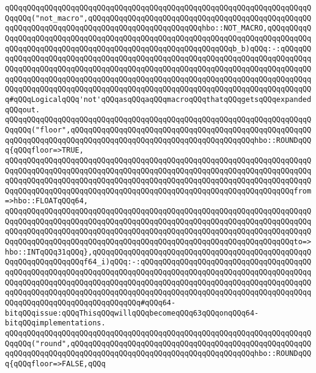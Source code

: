 \newline
\newline
\newline
\verb|qQQqqQQqqQQqqQQqqQQqqQQqqQQqqQQqqQQqqQQqqQQqqQQqqQQqqQQqqQQqqQQqqQQqqQQqqQQq("not_macro",qQQqqQQqqQQqqQQqqQQqqQQqqQQqqQQqqQQqqQQqqQQqqQQqqQQqqQQqqQQqqQQqqQQqqQQqqQQqqQQqqQQqqQQqqQQqqQQqhbo::NOT_MACRO,qQQqqQQqqQQqqQQqqQQqqQQqqQQqqQQqqQQqqQQqqQQqqQQqqQQqqQQqqQQqqQQqqQQqqQQqqQQqqQQqqQQqqQQqqQQqqQQqqQQqqQQqqQQqqQQqqQQqqQQqqQQqqQQqqQQqb_b)qQQq:-:qQQqqQQqqQQqqQQqqQQqqQQqqQQqqQQqqQQqqQQqqQQqqQQqqQQqqQQqqQQqqQQqqQQqqQQqqQQqqQQqqQQqqQQqqQQqqQQqqQQqqQQqqQQqqQQqqQQqqQQqqQQqqQQqqQQqqQQqqQQqqQQqqQQqqQQqqQQqqQQqqQQqqQQqqQQqqQQqqQQqqQQqqQQqqQQqqQQqqQQqqQQqqQQqqQQqqQQqqQQqqQQqqQQqqQQqqQQqqQQqqQQqqQQqqQQqqQQqqQQqqQQqqQQqqQQqqQQqqQQqqQQqqQQq#qQQqLogicalqQQq'not'qQQqasqQQqaqQQqmacroqQQqthatqQQqgetsqQQqexpandedqQQqout.|\newline
\newline
\verb|qQQqqQQqqQQqqQQqqQQqqQQqqQQqqQQqqQQqqQQqqQQqqQQqqQQqqQQqqQQqqQQqqQQqqQQqqQQq("floor",qQQqqQQqqQQqqQQqqQQqqQQqqQQqqQQqqQQqqQQqqQQqqQQqqQQqqQQqqQQqqQQqqQQqqQQqqQQqqQQqqQQqqQQqqQQqqQQqqQQqqQQqqQQqqQQqhbo::ROUNDqQQq{qQQqfloor=>TRUE,|\newline
\verb|qQQqqQQqqQQqqQQqqQQqqQQqqQQqqQQqqQQqqQQqqQQqqQQqqQQqqQQqqQQqqQQqqQQqqQQqqQQqqQQqqQQqqQQqqQQqqQQqqQQqqQQqqQQqqQQqqQQqqQQqqQQqqQQqqQQqqQQqqQQqqQQqqQQqqQQqqQQqqQQqqQQqqQQqqQQqqQQqqQQqqQQqqQQqqQQqqQQqqQQqqQQqqQQqqQQqqQQqqQQqqQQqqQQqqQQqqQQqqQQqqQQqqQQqqQQqqQQqqQQqqQQqqQQqqQQqqQQqfrom=>hbo::FLOATqQQq64,|\newline
\verb|qQQqqQQqqQQqqQQqqQQqqQQqqQQqqQQqqQQqqQQqqQQqqQQqqQQqqQQqqQQqqQQqqQQqqQQqqQQqqQQqqQQqqQQqqQQqqQQqqQQqqQQqqQQqqQQqqQQqqQQqqQQqqQQqqQQqqQQqqQQqqQQqqQQqqQQqqQQqqQQqqQQqqQQqqQQqqQQqqQQqqQQqqQQqqQQqqQQqqQQqqQQqqQQqqQQqqQQqqQQqqQQqqQQqqQQqqQQqqQQqqQQqqQQqqQQqqQQqqQQqqQQqqQQqqQQqqQQqto=>hbo::INTqQQq31qQQq},qQQqqQQqqQQqqQQqqQQqqQQqqQQqqQQqqQQqqQQqqQQqqQQqqQQqqQQqqQQqqQQqqQQqf64_i)qQQq:-:qQQqqQQqqQQqqQQqqQQqqQQqqQQqqQQqqQQqqQQqqQQqqQQqqQQqqQQqqQQqqQQqqQQqqQQqqQQqqQQqqQQqqQQqqQQqqQQqqQQqqQQqqQQqqQQqqQQqqQQqqQQqqQQqqQQqqQQqqQQqqQQqqQQqqQQqqQQqqQQqqQQqqQQqqQQqqQQqqQQqqQQqqQQqqQQqqQQqqQQqqQQqqQQqqQQqqQQqqQQqqQQqqQQqqQQqqQQqqQQqqQQqqQQqqQQqqQQqqQQqqQQqqQQqqQQqqQQqqQQq#qQQq64-bitqQQqissue:qQQqThisqQQqwillqQQqbecomeqQQq63qQQqonqQQq64-bitqQQqimplementations.|\newline
\verb|qQQqqQQqqQQqqQQqqQQqqQQqqQQqqQQqqQQqqQQqqQQqqQQqqQQqqQQqqQQqqQQqqQQqqQQqqQQq("round",qQQqqQQqqQQqqQQqqQQqqQQqqQQqqQQqqQQqqQQqqQQqqQQqqQQqqQQqqQQqqQQqqQQqqQQqqQQqqQQqqQQqqQQqqQQqqQQqqQQqqQQqqQQqqQQqhbo::ROUNDqQQq{qQQqfloor=>FALSE,qQQq|\newline

